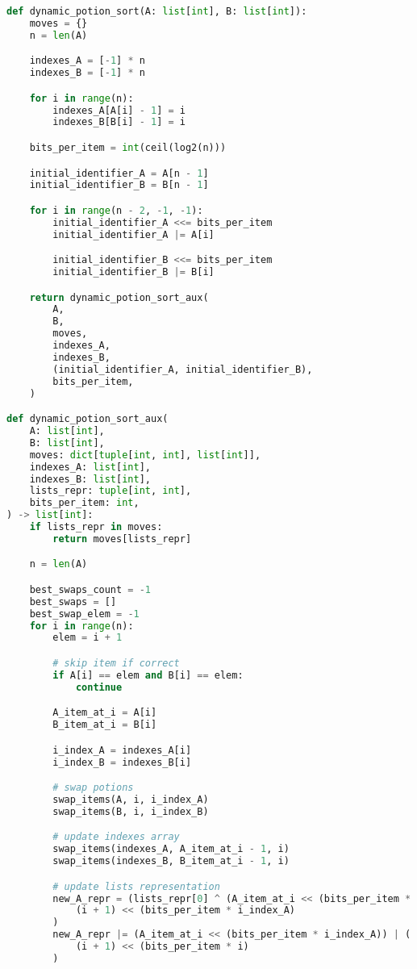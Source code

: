 \documentclass{article}
\begin{document}
\begin{lstlisting}[language=Python]
def dynamic_potion_sort(A: list[int], B: list[int]):
    moves = {}
    n = len(A)

    indexes_A = [-1] * n
    indexes_B = [-1] * n

    for i in range(n):
        indexes_A[A[i] - 1] = i
        indexes_B[B[i] - 1] = i

    bits_per_item = int(ceil(log2(n)))

    initial_identifier_A = A[n - 1]
    initial_identifier_B = B[n - 1]

    for i in range(n - 2, -1, -1):
        initial_identifier_A <<= bits_per_item
        initial_identifier_A |= A[i]

        initial_identifier_B <<= bits_per_item
        initial_identifier_B |= B[i]

    return dynamic_potion_sort_aux(
        A,
        B,
        moves,
        indexes_A,
        indexes_B,
        (initial_identifier_A, initial_identifier_B),
        bits_per_item,
    )

def dynamic_potion_sort_aux(
    A: list[int],
    B: list[int],
    moves: dict[tuple[int, int], list[int]],
    indexes_A: list[int],
    indexes_B: list[int],
    lists_repr: tuple[int, int],
    bits_per_item: int,
) -> list[int]:
    if lists_repr in moves:
        return moves[lists_repr]

    n = len(A)

    best_swaps_count = -1
    best_swaps = []
    best_swap_elem = -1
    for i in range(n):
        elem = i + 1

        # skip item if correct
        if A[i] == elem and B[i] == elem:
            continue

        A_item_at_i = A[i]
        B_item_at_i = B[i]

        i_index_A = indexes_A[i]
        i_index_B = indexes_B[i]

        # swap potions
        swap_items(A, i, i_index_A)
        swap_items(B, i, i_index_B)

        # update indexes array
        swap_items(indexes_A, A_item_at_i - 1, i)
        swap_items(indexes_B, B_item_at_i - 1, i)

        # update lists representation
        new_A_repr = (lists_repr[0] ^ (A_item_at_i << (bits_per_item * i))) ^ (
            (i + 1) << (bits_per_item * i_index_A)
        )
        new_A_repr |= (A_item_at_i << (bits_per_item * i_index_A)) | (
            (i + 1) << (bits_per_item * i)
        )


\end{lstlisting}
\end{document}
